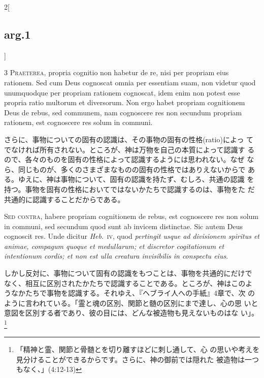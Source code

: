 \documentclass[paper=a4paper,fontsize=10pt,jafontsize=9pt,titlepage]{jlreq}
\begin{document}
\begin{paracol}{2}[\subsection{arg.1}]

{\scshape 3 Praeterea}, propria cognitio non habetur de re, nisi per
propriam eius rationem. Sed cum Deus cognoscat omnia per essentiam
suam, non videtur quod unumquodque per propriam rationem cognoscat,
idem enim non potest esse propria ratio multorum et diversorum. Non
ergo habet propriam cognitionem Deus de rebus, sed communem, nam
cognoscere res non secundum propriam rationem, est cognoscere res
solum in communi.

\switchcolumn

さらに、事物についての固有の認識は、その事物の固有の性格(ratio)によっ
てでなければ所有されない。ところが、神は万物を自己の本質によって認識す
るので、各々のものを固有の性格によって認識するようには思われない。なぜ
なら、同じものが、多くのさまざまなものの固有の性格ではありえないからで
ある。ゆえに、神は事物について、固有の認識を持たず、むしろ、共通の認識
を持つ。事物を固有の性格においてではないかたちで認識するのは、事物をた
だ共通的に認識することだからである。

\switchcolumn*[\subsection{s.c.}]

{\scshape Sed contra}, habere propriam cognitionem de rebus, est
cognoscere res non solum in communi, sed secundum quod sunt ab invicem
distinctae. Sic autem Deus cognoscit res. Unde dicitur {\itshape
Heb}.~{\scshape iv}, quod {\itshape pertingit usque ad divisionem
spiritus et animae, compagum quoque et medullarum; et discretor
cogitationum et intentionum cordis; et non est ulla creatura
invisibilis in conspectu eius}.

\switchcolumn

しかし反対に、事物について固有の認識をもつことは、事物を共通的にだけで
なく、相互に区別されたかたちで認識することである。ところが、神はこのよ
うなかたちで事物を認識する。それゆえ、『ヘブライ人への手紙』4章で、次
のように言われている。「霊と魂の区別、関節と髄の区別にまで達し、心の思
いと意図を区別する者であり、彼の目には、どんな被造物も見えないものはな
い」。\footnote{「精神と霊、関節と骨髄とを切り離すほどに刺し通して、心
の思いや考えを見分けることができるからです。さらに、神の御前では隠れた
被造物は一つもなく、」(4:12-13)}



\end{paracol}
\end{document}
